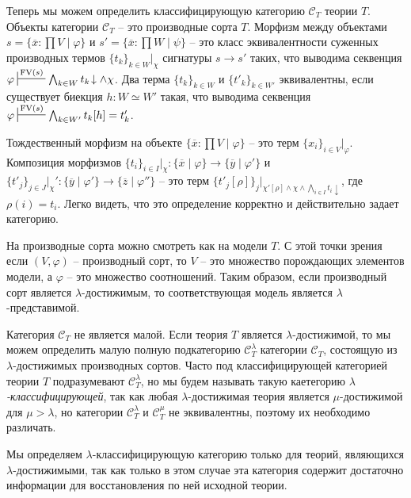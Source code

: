 \documentclass[reqno]{amsart}
\theoremstyle{definition}
\theoremstyle{remark}
\newcommand{\cat}[1]{\mathcal{#1}}
\newcommand{\fs}[1]{\mathrm{#1}}
\newcommand{\FV}{\fs{FV}}
\begin{document}
Теперь мы можем определить классифицирующую категорию $\cat{C}_T$ теории $T$.
Объекты категории $\cat{C}_T$ -- это производные сорта $T$.
Морфизм между объектами $s = \{ \overline{x} : \prod V \mid \varphi \}$ и $s' = \{ \overline{x} : \prod W \mid \psi \}$ -- это класс эквивалентности суженных производных термов $\{ t_k \}_{k \in W}|_\chi$ сигнатуры $s \to s'$ таких,
что выводима секвенция $\varphi \sststile{}{\FV(s)} \bigwedge_{k \in W} t_k\!\downarrow \land \chi$.
Два терма $\{ t_k \}_{k \in W}$ и $\{ t'_k \}_{k \in W'}$ эквивалентны, если существует биекция $h : W \simeq W'$ такая, что выводима секвенция $\varphi \sststile{}{\FV(s)} \bigwedge_{k \in W'} t_k[h] = t'_k$.

Тождественный морфизм на объекте $\{ \overline{x} : \prod V \mid \varphi \}$ -- это терм $\{ x_i \}_{i \in V}|_\varphi$.
Композиция морфизмов $\{ t_i \}_{i \in I}|_\chi : \{ \overline{x} \mid \varphi \} \to \{ \overline{y} \mid \varphi' \}$
и $\{ t'_j \}_{j \in J}|_\chi' : \{ \overline{y} \mid \varphi' \} \to \{ \overline{z} \mid \varphi'' \}$ -- это терм $\{ t'_j[\rho] \}_j|_{\chi'[\rho] \land \chi \land \bigwedge_{i \in I} t_i \downarrow}$, где $\rho(i) = t_i$.
Легко видеть, что это определение корректно и действительно задает категорию.

\begin{remark}
На производные сорта можно смотреть как на модели $T$.
С этой точки зрения если $(V,\varphi)$ -- производный сорт, то $V$ -- это множество порождающих элементов модели, а $\varphi$ -- это множество соотношений.
Таким образом, если производный сорт является $\lambda$-достижимым, то соответствующая модель является $\lambda$-представимой.
\end{remark}

Категория $\cat{C}_T$ не является малой.
Если теория $T$ является $\lambda$-достижимой, то мы можем определить малую полную подкатегорию $\cat{C}_T^\lambda$ категории $\cat{C}_T$, состоящую из $\lambda$-достижимых производных сортов.
Часто под классифицирующей категорией теории $T$ подразумевают $\cat{C}_T^\lambda$, но мы будем называть такую каетегорию \emph{$\lambda$-классифицирующей},
так как любая $\lambda$-достижимая теория является $\mu$-достижимой для $\mu > \lambda$, но категории $\cat{C}_T^\lambda$ и $\cat{C}_T^\mu$ не эквивалентны, поэтому их необходимо различать.

\begin{remark}
Мы определяем $\lambda$-классифицирующую категорию только для теорий, являющихся $\lambda$-достижимыми,
так как только в этом случае эта категория содержит достаточно информации для восстановления по ней исходной теории.
\end{remark}
\end{document}
